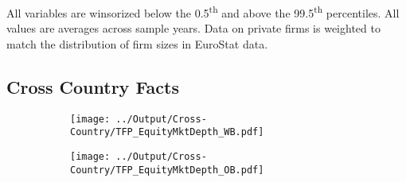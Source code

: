 \documentclass[12pt,notitlepage]{article}
\begin{document}
\begin{table}[!htpb]
\caption{French Summary Statistics}

All variables are winsorized below the 0.5\textsuperscript{th} and above the 99.5\textsuperscript{th} percentiles. All values are averages across sample years. Data on private firms is weighted to match the distribution of firm sizes in EuroStat data.
\end{table}




\clearpage



\FloatBarrier
\subsection{Cross Country Facts} %
\label{sec:cross_country_facts}
\FloatBarrier



\begin{figure}[!htpb]
\centering
\caption{Total Factor Productivity (European Countries)}
\begin{subfigure}{.49\textwidth}
    \centering
 \texttt{[image: ../Output/Cross-Country/TFP\_EquityMktDepth\_WB.pdf]}
\end{subfigure}
\begin{subfigure}{.49\textwidth}
    \centering
  \texttt{[image: ../Output/Cross-Country/TFP\_EquityMktDepth\_OB.pdf]}
\end{subfigure}
\end{figure}
\FloatBarrier
\end{document}
